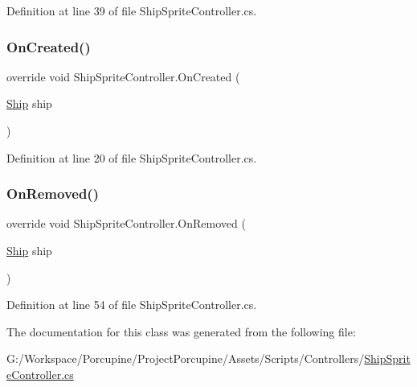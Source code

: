 Definition at line 39 of file Ship\+Sprite\+Controller.\+cs.

\mbox{\label{class_ship_sprite_controller_a151f6e80970e4a2e5536f76978c546ca}} 
\subsubsection{\texorpdfstring{On\+Created()}{OnCreated()}}
{\footnotesize\ttfamily override void Ship\+Sprite\+Controller.\+On\+Created (\begin{DoxyParamCaption}\item[{\hyperlink{class_ship}{Ship}}]{ship }\end{DoxyParamCaption})\hspace{0.3cm}{\ttfamily [protected]}}



Definition at line 20 of file Ship\+Sprite\+Controller.\+cs.

\mbox{\label{class_ship_sprite_controller_ae094f3407c6c86e5ac29eb31b969c5c8}} 
\subsubsection{\texorpdfstring{On\+Removed()}{OnRemoved()}}
{\footnotesize\ttfamily override void Ship\+Sprite\+Controller.\+On\+Removed (\begin{DoxyParamCaption}\item[{\hyperlink{class_ship}{Ship}}]{ship }\end{DoxyParamCaption})\hspace{0.3cm}{\ttfamily [protected]}}



Definition at line 54 of file Ship\+Sprite\+Controller.\+cs.



The documentation for this class was generated from the following file\+:\begin{DoxyCompactItemize}
\item 
G\+:/\+Workspace/\+Porcupine/\+Project\+Porcupine/\+Assets/\+Scripts/\+Controllers/\hyperlink{_ship_sprite_controller_8cs}{Ship\+Sprite\+Controller.\+cs}\end{DoxyCompactItemize}
